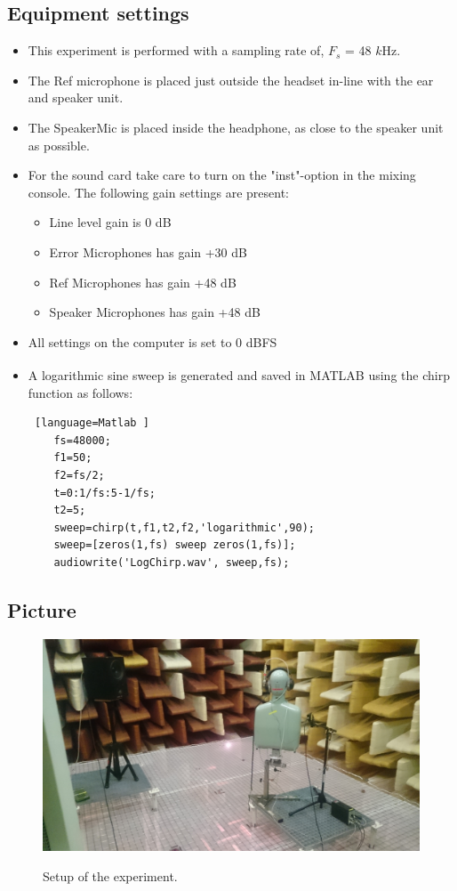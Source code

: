 \subsection{Equipment settings}
\begin{itemize}
	\item This experiment is performed with a sampling rate of, $F_{s}$ = 48 $k$Hz.
	\item The Ref microphone is placed just outside the headset in-line with the ear and speaker unit. 
	\item The SpeakerMic is placed inside the headphone, as close to the speaker unit as possible. 
	\item For the sound card take care to turn on the "inst"-option in the mixing console. The following gain settings are present: 		
	\begin{itemize}
		\item Line level gain is 0 dB
		\item Error Microphones has gain +30 dB
		\item Ref Microphones has gain +48 dB
		\item Speaker Microphones has gain +48 dB
	\end{itemize}
	\item All settings on the computer is set to 0 dBFS
	\item A logarithmic sine sweep is generated and saved in MATLAB\textsuperscript{\textregistered} using the chirp function as follows:
	\begin{lstlisting} [language=Matlab	]
	fs=48000;
	f1=50;
	f2=fs/2;
	t=0:1/fs:5-1/fs;
	t2=5;
	sweep=chirp(t,f1,t2,f2,'logarithmic',90);
	sweep=[zeros(1,fs) sweep zeros(1,fs)];
	audiowrite('LogChirp.wav', sweep,fs);
	\end{lstlisting}
\end{itemize}

\subsection{Picture}
\begin{figure}[H]
	\includegraphics[width=\textwidth]{../Journal/Experiments/AngleOfIncidence/AngInSetup.jpg}
	\label{AngIncidenceSetup}	
	\caption{Setup of the experiment.}
\end{figure}


